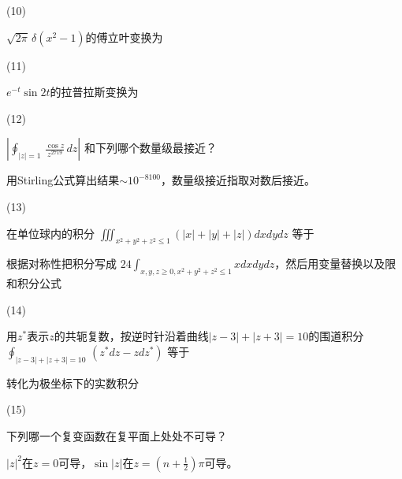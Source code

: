 \documentclass[12pt,CJK]{article}
\begin{document}
{{  }


\item[(10)]{$\sqrt{2\pi}\,\delta (x^2-1)$的傅立叶变换为 

  }

\item[(11)]{$e^{-t}\sin{2t}$的拉普拉斯变换为 

  }

\item[(12)]{$ \left\vert\oint_{|z|=1}\, \frac{\cos z}{z^{2719}}\,dz\right\vert$ 和下列哪个数量级最接近？ 


{\small \red 用Stirling公式算出结果$\sim 10^{-8100}$，数量级接近指取对数后接近。}
}

\item[(13)]{ 在单位球内的积分 $\iiint_{x^2+y^2+z^2\le 1} (|x|+|y|+|z|)dxdydz$ 等于 


{\small \red 根据对称性把积分写成 $24\int_{x,y,z\ge 0, x^2+y^2+z^2\le 1} x dxdydz$，然后用变量替换以及限和积分公式}
}
  
\item[(14)]{用$z^*$表示$z$的共轭复数，按逆时针沿着曲线$|z-3|+|z+3|=10$的围道积分$\oint_{|z-3|+|z+3|=10}\, (z^*dz - zdz^*)$  等于 
  
  \optlist{$48\pi\ii$}{$60\pi\ii$}{$80\pi\ii$}{$96\pi\ii$}

  {\small \red 转化为极坐标下的实数积分}
}

\item[(15)]{下列哪一个复变函数在复平面上处处不可导？ 


  {\small \red  $|z|^2$在$z=0$可导，$\sin |z|$在$z=\left(n+\frac{1}{2}\right)\pi$可导。}
}  
    
  \eitem
  }
\end{document}
